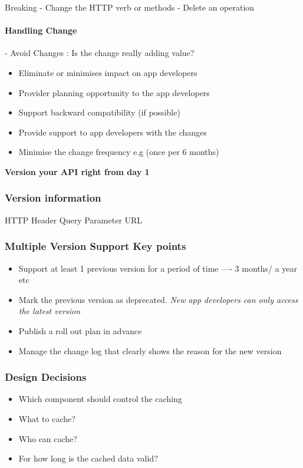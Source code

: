 \documentclass[a4paper, 11pt]{book}
\begin{document}
    Breaking
    - Change the HTTP verb or methods
    - Delete an operation

    \paragraph{Handling Change}
    - Avoid Changes : Is the change really adding value?
    \begin{itemize}
        \item Eliminate or minimises impact on app developers
        \item Provider planning opportunity to the app developers
        \item Support backward compatibility (if possible)
        \item Provide support to app developers with the changes
        \item Minimise the change frequency e.g (once per 6 months)
    \end{itemize}
    \textbf{Version your API right from day 1}

    \subsubsection{Version information}
    HTTP Header
    Query Parameter
    URL

    \subsubsection{Multiple Version Support Key points}
    \begin{itemize}
        \item Support at least 1 previous version for a period of time ---- 3 months/ a year etc
        \item Mark the previous version as deprecated. \textit{New app developers can only access the latest version}
        \item Publish a roll out plan in advance
        \item Manage the change log that clearly shows the reason for the new version
    \end{itemize}

    \subsubsection{Design Decisions}
    \begin{itemize}
        \item Which component should control the caching
        \item What to cache?
        \item Who can cache?
        \item For how long is the cached data valid?
    \end{itemize}
\end{document}
